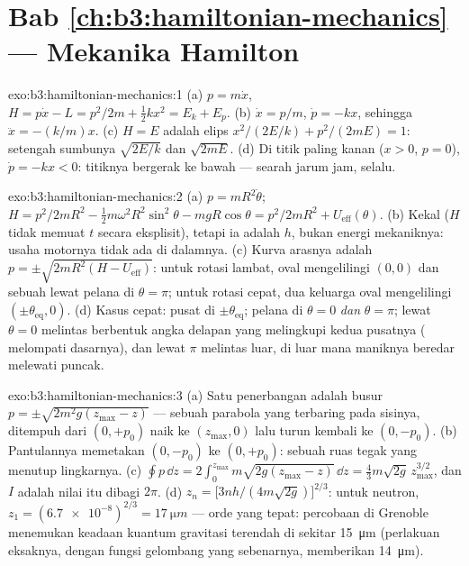 \section*{Bab \ref{ch:b3:hamiltonian-mechanics} --- Mekanika Hamilton}

\begin{solution}{exo:b3:hamiltonian-mechanics:1}
(a) $p = m\dot x$, $H = p\dot x - L = p^2/2m + \tfrac12 kx^2 = E_k +
E_p$. (b) $\dot x = p/m$, $\dot p = -kx$, sehingga $\ddot x = -(k/m)x$.
(c) $H = E$ adalah elips $x^2/(2E/k) + p^2/(2mE) = 1$: setengah sumbunya
$\sqrt{2E/k}$ dan $\sqrt{2mE}$. (d) Di titik paling kanan ($x > 0$,
$p = 0$), $\dot p = -kx < 0$: titiknya bergerak ke bawah --- searah
jarum jam, selalu.
\end{solution}

\begin{solution}{exo:b3:hamiltonian-mechanics:2}
(a) $p = mR^2\dot\theta$; $H = p^2/2mR^2 - \tfrac12 m\omega^2R^2
\sin^2\theta - mgR\cos\theta = p^2/2mR^2 + U_{\text{eff}}(\theta)$.
(b) Kekal ($H$ tidak memuat $t$ secara eksplisit), tetapi ia adalah $h$,
bukan energi mekaniknya: usaha motornya tidak ada di dalamnya. (c) Kurva
arasnya adalah $p = \pm\sqrt{2mR^2(H - U_{\text{eff}})}$: untuk rotasi
lambat, oval mengelilingi $(0, 0)$ dan sebuah  lewat pelana
di $\theta = \pi$; untuk rotasi cepat, dua keluarga oval mengelilingi
$(\pm\theta_{\text{eq}}, 0)$. (d) Kasus cepat: pusat di
$\pm\theta_{\text{eq}}$; pelana di $\theta = 0$ \emph{dan} $\theta =
\pi$; lewat $\theta = 0$ melintas  berbentuk angka delapan
yang melingkupi kedua pusatnya ( melompati dasarnya), dan
lewat $\pi$ melintas  luar, di luar mana maniknya beredar
melewati puncak.
\end{solution}

\begin{solution}{exo:b3:hamiltonian-mechanics:3}
(a) Satu penerbangan adalah busur $p = \pm\sqrt{2m^2g(z_{\max} - z)}$ ---
sebuah parabola yang terbaring pada sisinya, ditempuh dari $(0, +p_0)$ naik ke
$(z_{\max}, 0)$ lalu turun kembali ke $(0, -p_0)$. (b) Pantulannya memetakan
$(0, -p_0)$ ke $(0, +p_0)$: sebuah ruas tegak yang menutup lingkarnya. (c)
$\oint p\,\dd z = 2\int_0^{z_{\max}}m\sqrt{2g(z_{\max} - z)}\,\dd z =
\tfrac43 m\sqrt{2g}\,z_{\max}^{3/2}$, dan $I$ adalah nilai itu dibagi $2\pi$. (d)
$z_n = \big[3nh/(4m\sqrt{2g})\big]^{2/3}$: untuk neutron, $z_1 =
(\num{6.7e-8})^{2/3} = \qty{17}{\micro m}$ --- orde yang tepat:
percobaan di Grenoble menemukan keadaan kuantum gravitasi terendah di
sekitar \qty{15}{\micro m} (perlakuan eksaknya, dengan fungsi gelombang
yang sebenarnya, memberikan \qty{14}{\micro m}).
\end{solution}

